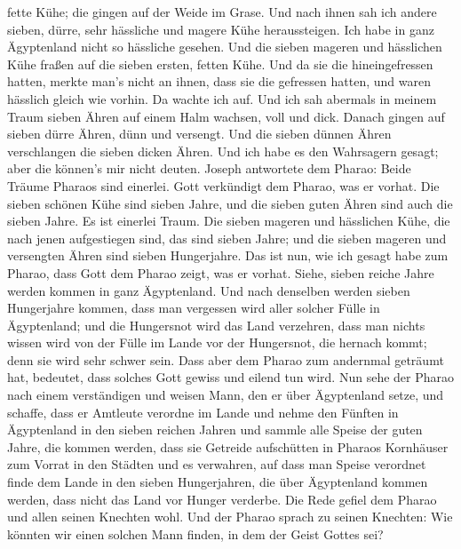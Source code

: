 fette Kühe; die gingen auf der Weide im Grase.  Und nach
ihnen sah ich andere sieben, dürre, sehr hässliche und magere Kühe
heraussteigen. Ich habe in ganz Ägyptenland nicht so hässliche gesehen.
 Und die sieben mageren und hässlichen Kühe fraßen auf
die sieben ersten, fetten Kühe.  Und da sie die
hineingefressen hatten, merkte man's nicht an ihnen, dass sie die
gefressen hatten, und waren hässlich gleich wie vorhin. Da wachte ich
auf.  Und ich sah abermals in meinem Traum sieben Ähren
auf einem Halm wachsen, voll und dick.  Danach gingen auf
sieben dürre Ähren, dünn und versengt.  Und die sieben
dünnen Ähren verschlangen die sieben dicken Ähren. Und ich habe es den
Wahrsagern gesagt; aber die können's mir nicht deuten. 
Joseph antwortete dem Pharao: Beide Träume Pharaos sind einerlei. Gott
verkündigt dem Pharao, was er vorhat.  Die sieben schönen
Kühe sind sieben Jahre, und die sieben guten Ähren sind auch die sieben
Jahre. Es ist einerlei Traum.  Die sieben mageren und
hässlichen Kühe, die nach jenen aufgestiegen sind, das sind sieben
Jahre; und die sieben mageren und versengten Ähren sind sieben
Hungerjahre.  Das ist nun, wie ich gesagt habe zum
Pharao, dass Gott dem Pharao zeigt, was er vorhat. 
Siehe, sieben reiche Jahre werden kommen in ganz Ägyptenland.
 Und nach denselben werden sieben Hungerjahre kommen,
dass man vergessen wird aller solcher Fülle in Ägyptenland; und die
Hungersnot wird das Land verzehren,  dass man nichts
wissen wird von der Fülle im Lande vor der Hungersnot, die hernach
kommt; denn sie wird sehr schwer sein.  Dass aber dem
Pharao zum andernmal geträumt hat, bedeutet, dass solches Gott gewiss
und eilend tun wird.  Nun sehe der Pharao nach einem
verständigen und weisen Mann, den er über Ägyptenland setze,
 und schaffe, dass er Amtleute verordne im Lande und
nehme den Fünften in Ägyptenland in den sieben reichen Jahren
 und sammle alle Speise der guten Jahre, die kommen
werden, dass sie Getreide aufschütten in Pharaos Kornhäuser zum Vorrat
in den Städten und es verwahren,  auf dass man Speise
verordnet finde dem Lande in den sieben Hungerjahren, die über
Ägyptenland kommen werden, dass nicht das Land vor Hunger verderbe.
 Die Rede gefiel dem Pharao und allen seinen Knechten
wohl.  Und der Pharao sprach zu seinen Knechten: Wie
könnten wir einen solchen Mann finden, in dem der Geist Gottes sei?
